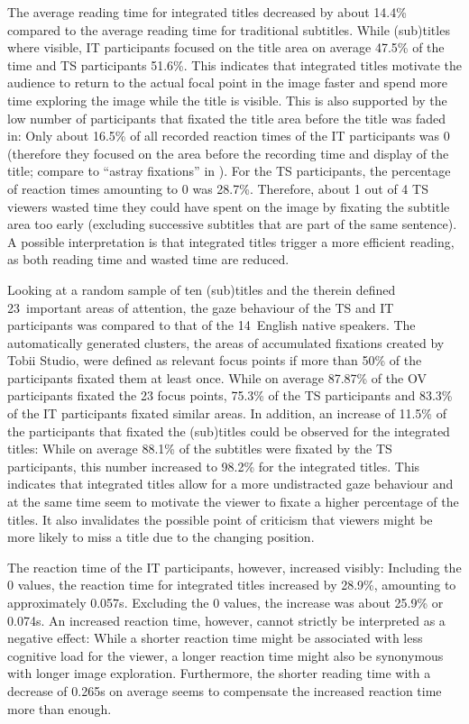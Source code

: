 \documentclass[output=paper]{langsci/langscibook}
\begin{document}
The average reading time for integrated titles decreased by about 14.4\% compared to the average reading time for traditional subtitles. While (sub)titles where visible, IT participants focused on the title area on average 47.5\% of the time and TS participants 51.6\%. This indicates that integrated titles motivate the audience to return to the actual focal point in the image faster and spend more time exploring the image while the title is visible. This is also supported by the low number of participants that fixated the title area before the title was faded in: Only about 16.5\% of all recorded reaction times of the IT participants was 0 (therefore they focused on the area before the recording time and display of the title; compare to ``astray fixations'' in \citealt{rajendran2013}). For the TS participants, the percentage of reaction times amounting to 0 was 28.7\%. Therefore, about 1 out of 4 TS viewers wasted time they could have spent on the image by fixating the subtitle area too early (excluding successive subtitles that are part of the same sentence). A possible interpretation is that integrated titles trigger a more efficient reading, as both reading time and wasted time are reduced.



Looking at a random sample of ten (sub)titles and the therein defined 23~important areas of attention, the gaze behaviour of the TS and IT participants was compared to that of the 14~English native speakers. The automatically generated clusters, the areas of accumulated fixations created by Tobii Studio, were defined as relevant focus points if more than 50\% of the participants fixated them at least once. While on average 87.87\% of the OV participants fixated the 23 focus points, 75.3\% of the TS participants and 83.3\% of the IT participants fixated similar areas. In addition, an increase of 11.5\% of the participants that fixated the (sub)titles could be observed for the integrated titles: While on average 88.1\% of the subtitles were fixated by the TS participants, this number increased to 98.2\% for the integrated titles. This indicates that integrated titles allow for a more undistracted gaze behaviour and at the same time seem to motivate the viewer to fixate a higher percentage of the titles. It also invalidates the possible point of criticism that viewers might be more likely to miss a title due to the changing position.



The reaction time of the IT participants, however, increased visibly: Including the 0 values, the reaction time for integrated titles increased by 28.9\%, amounting to approximately 0.057s. Excluding the 0 values, the increase was about 25.9\% or 0.074s. An increased reaction time, however, cannot strictly be interpreted as a negative effect: While a shorter reaction time might be associated with less cognitive load for the viewer, a longer reaction time might also be synonymous with longer image exploration. Furthermore, the shorter reading time with a decrease of 0.265s on average seems to compensate the increased reaction time more than enough.
\end{document}
